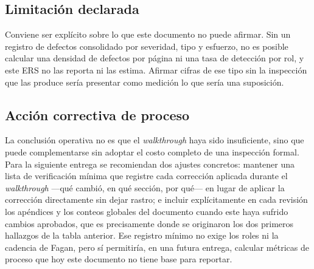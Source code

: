 \subsection{Limitación declarada}
 
Conviene ser explícito sobre lo que este documento no puede afirmar. Sin un registro de defectos
consolidado por severidad, tipo y esfuerzo, no es posible calcular una densidad de defectos por
página ni una tasa de detección por rol, y este ERS no las reporta ni las estima. Afirmar cifras de
ese tipo sin la inspección que las produce sería presentar como medición lo que sería una suposición.
 
\subsection{Acción correctiva de proceso}
 
La conclusión operativa no es que el \emph{walkthrough} haya sido insuficiente, sino que puede
complementarse sin adoptar el costo completo de una inspección formal. Para la siguiente entrega se
recomiendan dos ajustes concretos: mantener una lista de verificación mínima que registre cada
corrección aplicada durante el \emph{walkthrough} ---qué cambió, en qué sección, por qué--- en lugar
de aplicar la corrección directamente sin dejar rastro; e incluir explícitamente en cada revisión los
apéndices y los conteos globales del documento cuando este haya sufrido cambios aprobados, que es
precisamente donde se originaron los dos primeros hallazgos de la tabla anterior. Ese registro
mínimo no exige los roles ni la cadencia de Fagan, pero sí permitiría, en una futura entrega, calcular
métricas de proceso que hoy este documento no tiene base para reportar.
 
